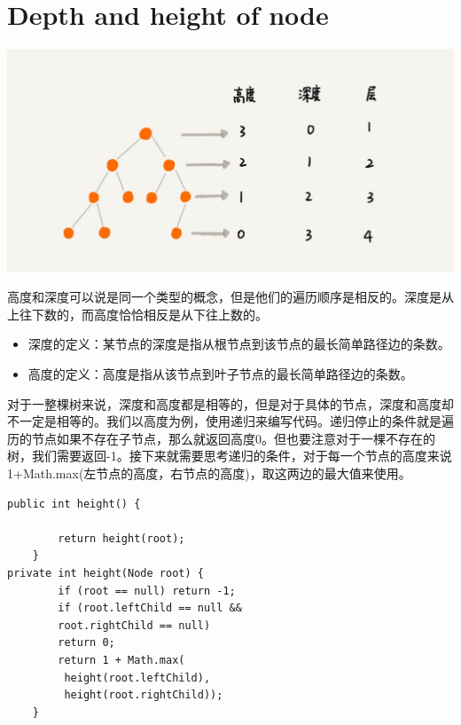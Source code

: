 \documentclass[
	11pt,
	fleqn,
	a4paper,
]{LegrandOrangeBook}
\begin{document}
\section{Depth and height of node}
\begin{center}
    \includegraphics[scale=0.3]{Images/ABXGfH.jpg}
\end{center}
高度和深度可以说是同一个类型的概念，但是他们的遍历顺序是相反的。深度是从上往下数的，而高度恰恰相反是从下往上数的。
\begin{itemize}
    \item 深度的定义：某节点的深度是指从根节点到该节点的最长简单路径边的条数。
    \item 高度的定义：高度是指从该节点到叶子节点的最长简单路径边的条数。
\end{itemize}
对于一整棵树来说，深度和高度都是相等的，但是对于具体的节点，深度和高度却不一定是相等的。我们以高度为例，使用递归来编写代码。递归停止的条件就是遍历的节点如果不存在子节点，那么就返回高度0。但也要注意对于一棵不存在的树，我们需要返回-1。接下来就需要思考递归的条件，对于每一个节点的高度来说1+Math.max(左节点的高度，右节点的高度)，取这两边的最大值来使用。
\begin{verbatim}
public int height() {

        return height(root);
    }
private int height(Node root) {
        if (root == null) return -1;
        if (root.leftChild == null &&
        root.rightChild == null)
        return 0;
        return 1 + Math.max(
         height(root.leftChild),
         height(root.rightChild));
    }
\end{verbatim}
\end{document}
